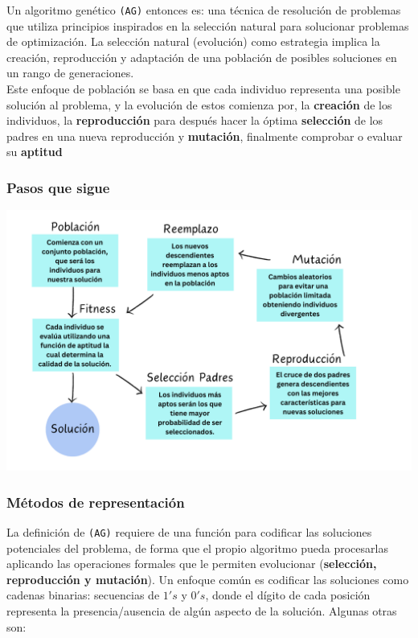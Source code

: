 Un algoritmo genético \texttt{(AG)} entonces es: una técnica de resolución de problemas 
que utiliza principios inspirados en la selección natural para solucionar problemas de 
optimización. La selección natural (evolución) como estrategia implica la creación, 
reproducción y adaptación de una población de posibles soluciones en un rango de generaciones.\\ 

Este enfoque de población se basa en que cada individuo representa una posible solución 
al problema, y la evolución de estos comienza por, la \textbf{creación} de los individuos, 
la \textbf{reproducción} para después hacer la óptima \textbf{selección} de los padres en 
una nueva reproducción y \textbf{mutación}, finalmente comprobar o evaluar su \textbf{aptitud}\\ 


\subsubsection*{Pasos que sigue}

\begin{center}
    \includegraphics[scale = .4]{IMA/algo genetico.png}
\end{center}

\subsubsection*{Métodos de representación}

La definición de \texttt{(AG)} requiere de una función para codificar las soluciones 
potenciales del problema, de forma que el propio algoritmo pueda procesarlas aplicando las 
operaciones formales que le permiten evolucionar (\textbf{selección, reproducción y 
mutación}). Un enfoque común es codificar las soluciones como cadenas binarias: secuencias de 
$1's$ y $0's$, donde el dígito de cada posición representa la presencia/ausencia de algún 
aspecto de la solución.\cite{almosgenos} Algunas otras son:\\ 

